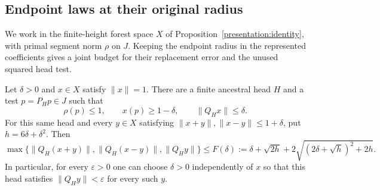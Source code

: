 \subsection{Endpoint laws at their original radius}
\label{molb:unscaled-section}

We work in the finite-height forest space $X$ of
Proposition~\ref{presentation:identity}, with primal segment norm
$\rho$ on $J$. Keeping the endpoint radius in the represented
coefficients gives a joint budget for their replacement error and
the unused squared head test.

\begin{proposition}\label{molb:unscaled-tail}
Let $\delta>0$ and $x\in X$ satisfy $\|x\|=1$. There are a finite
ancestral head $H$ and a test $p=P_Hp\in J$ such that
\begin{equation}\label{molb:unscaled-head}
 \rho(p)\le1,\qquad x(p)\ge1-\delta,\qquad
 \|Q_Hx\|\le\delta.
\end{equation}
For this same head and every $y\in X$ satisfying
$\|x+y\|,\|x-y\|\le1+\delta$, put $h=6\delta+\delta^2$. Then
\begin{equation}\label{molb:unscaled-bound}
 \max\{\|Q_H(x+y)\|,\|Q_H(x-y)\|,\|Q_Hy\|\}
 \le F(\delta):=
 \delta+\sqrt{2h}+2\sqrt{(2\delta+\sqrt h)^2+2h}.
\end{equation}
In particular, for every $\varepsilon>0$ one can choose $\delta>0$
independently of $x$ so that this head satisfies
$\|Q_Hy\|<\varepsilon$ for every such $y$.
\end{proposition}

